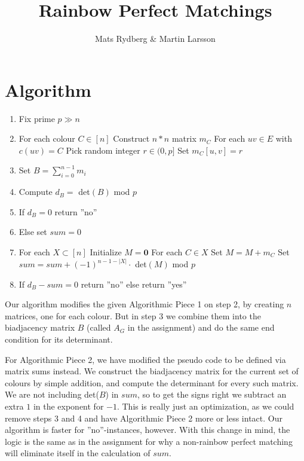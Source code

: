 \documentclass{tufte-handout}
\title{\sf Rainbow Perfect Matchings}
\author{Mats Rydberg \& Martin Larsson}
\begin{document}
\maketitle

\section{Algorithm}
\begin{enumerate}
\item Fix prime $p \gg n$ 
\item For each colour $C \in [n]$
\subitem Construct $n \ast n$ matrix $m_C$
\subitem For each $uv \in E$ with $ c(uv) = C$
\subsubitem Pick random integer $r \in (0,p]$
\subsubitem Set $m_C[u,v] = r$
\item Set $B = \sum_{i = 0}^{n-1}m_i$
\item Compute $d_B =$ det$(B)$ mod $p$
\item If $d_B = 0$ return ''no''
\item Else set $sum = 0$
\item For each $X \subset [n]$
\subitem Initialize $M = \mathbf{0}$ 
\subitem For each $C \in X$
\subsubitem Set $M = M + m_C$
\subitem Set $sum = sum + (-1)^{n-1-|X|} \cdot$ det$(M)$ mod $p$
\item If $d_B - sum = 0$ return ''no'' else return ''yes''
\end{enumerate}

\noindent Our algorithm modifies the given Algorithmic Piece 1 on step 2, by creating $n$ matrices, one for each colour. But in step 3 we combine them into the biadjacency matrix $B$ (called $A_G$ in the assignment) and do the same end condition for its determinant.

For Algorithmic Piece 2, we have modified the pseudo code to be defined via matrix sums instead. We construct the biadjacency matrix for the current set of colours by simple addition, and compute the determinant for every such matrix. We are not including det($B$) in $sum$, so to get the signs right we subtract an extra $1$ in the exponent for $-1$. This is really just an optimization, as we could remove steps 3 and 4 and have Algorithmic Piece 2 more or less intact. Our algorithm is faster for ''no''-instances, however. With this change in mind, the logic is the same as in the assignment for why a non-rainbow perfect matching will eliminate itself in the calculation of $sum$.
\newpage
\end{document}
